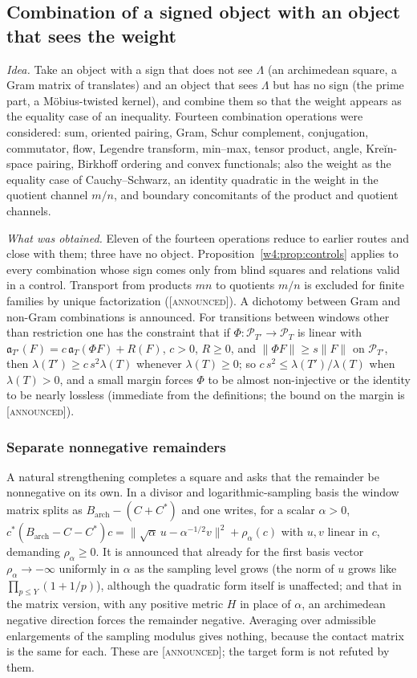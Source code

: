 \documentclass[11pt]{amsart}
\theoremstyle{definition}
\theoremstyle{remark}
\numberwithin{equation}{section}
\newcommand{\PT}{\mathcal{P}_T}                        %
\newcommand{\aT}{\mathfrak{a}_T}                       %
\newcommand{\stag}[1]{\textsc{[#1]}}
\newcommand{\ANNOUNCED}{\stag{announced}}
\newcommand{\entry}[1]{\par\smallskip\noindent\textit{#1.}\enspace}
\begin{document}
\subsection{Combination of a signed object with an object that sees the weight}\label{w4:fam:R2}

\entry{Idea} Take an object with a sign that does not see $\Lambda$ (an archimedean square, a Gram matrix of translates) and an
object that sees $\Lambda$ but has no sign (the prime part, a Möbius-twisted kernel), and combine them so that the weight appears
as the equality case of an inequality. Fourteen combination operations were considered: sum, oriented pairing, Gram, Schur complement,
conjugation, commutator, flow, Legendre transform, min--max, tensor product, angle, Kreĭn-space pairing, Birkhoff ordering and convex
functionals; also the weight as the equality case of Cauchy--Schwarz, an identity quadratic in the weight in the quotient channel
$m/n$, and boundary concomitants of the product and quotient channels.

\entry{What was obtained} Eleven of the fourteen operations reduce to earlier routes and close with them; three have no object.
Proposition~\ref{w4:prop:controls} applies to every combination whose sign comes only from blind squares and relations valid in a
control. Transport from products $mn$ to quotients $m/n$ is excluded for finite families by unique factorization (\ANNOUNCED). A
dichotomy between Gram and non-Gram combinations is announced. For transitions between windows other than restriction one has the
constraint that if $\Phi:\mathcal P_{T'}\to\PT$ is linear with $\mathfrak a_{T'}(F)=c\,\aT(\Phi F)+R(F)$, $c>0$, $R\ge0$, and $\|\Phi F\|\ge s\|F\|$ on $\mathcal P_{T'}$, then $\lambda(T')\ge c\,s^2\lambda(T)$ whenever $\lambda(T)\ge0$; so $c\,s^2\le\lambda(T')/\lambda(T)$ when $\lambda(T)>0$, and a small margin forces $\Phi$ to be almost non-injective or the identity to be nearly lossless (immediate from the definitions; the bound on the margin is \ANNOUNCED).

\subsubsection*{Separate nonnegative remainders}
A natural strengthening completes a square and asks that the remainder be nonnegative on its own. In a divisor and
logarithmic-sampling basis the window matrix splits as $B_{\mathrm{arch}}-(C+C^*)$ and one writes, for a scalar $\alpha>0$,
$c^*(B_{\mathrm{arch}}-C-C^*)c=\|\sqrt\alpha\,u-\alpha^{-1/2}v\|^2+\rho_\alpha(c)$ with $u,v$ linear in $c$, demanding $\rho_\alpha\ge0$.
It is announced that already for the first basis vector $\rho_\alpha\to-\infty$ uniformly in $\alpha$ as the sampling level grows
(the norm of $u$ grows like $\prod_{p\le Y}(1+1/p)$), although the quadratic form itself is unaffected; and that in the matrix version,
with any positive metric $H$ in place of $\alpha$, an archimedean negative direction forces the remainder negative. Averaging over
admissible enlargements of the sampling modulus gives nothing, because the contact matrix is the same for each. These are
\ANNOUNCED; the target form is not refuted by them.
\end{document}
